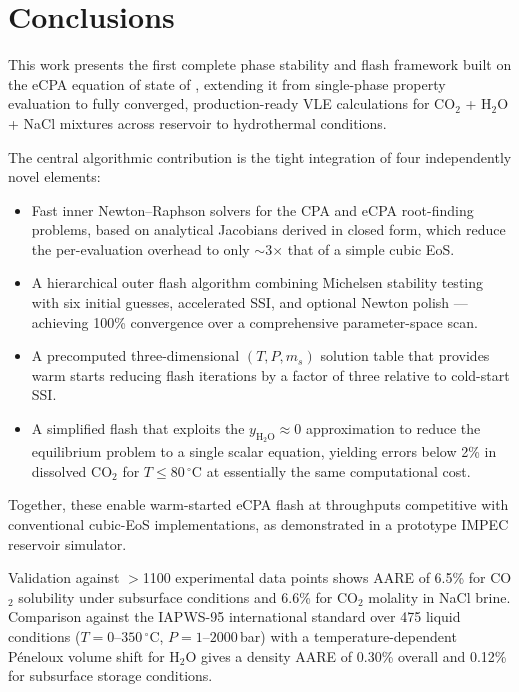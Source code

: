 \documentclass[preprint,12pt,number]{elsarticle}
\begin{document}
\section{Conclusions}
\label{sec:conclusions}

This work presents the first complete phase stability and flash framework built on the
eCPA equation of state of \citet{Coelho2025}, extending it from single-phase property
evaluation to fully converged, production-ready VLE calculations for CO$_2$ + H$_2$O +
NaCl mixtures across reservoir to hydrothermal conditions.

The central algorithmic contribution is the tight integration of four independently
novel elements:
\begin{itemize}
  \item Fast inner Newton--Raphson solvers for the CPA and eCPA root-finding problems,
        based on analytical Jacobians derived in closed form, which reduce the
        per-evaluation overhead to only $\sim$3$\times$ that of a simple cubic EoS.
  \item A hierarchical outer flash algorithm combining Michelsen stability testing with
        six initial guesses, accelerated SSI, and optional Newton polish --- achieving
        100\% convergence over a comprehensive parameter-space scan.
  \item A precomputed three-dimensional $(T, P, m_s)$ solution table that provides warm
        starts reducing flash iterations by a factor of three relative to cold-start SSI.
  \item A simplified flash that exploits the $y_{\text{H}_2\text{O}} \approx 0$
        approximation to reduce the equilibrium problem to a single scalar equation,
        yielding errors below 2\% in dissolved CO$_2$ for $T \leq 80\,^\circ$C at
        essentially the same computational cost.
\end{itemize}
Together, these enable warm-started eCPA flash at throughputs competitive with
conventional cubic-EoS implementations, as demonstrated in a prototype IMPEC reservoir
simulator.

Validation against $>$1100 experimental data points shows AARE of 6.5\% for CO$_2$
solubility under subsurface conditions and 6.6\% for CO$_2$ molality in NaCl brine.
Comparison against the IAPWS-95 international standard over 475 liquid conditions
($T = 0$--$350\,^\circ$C, $P = 1$--$2000$\,bar) with a temperature-dependent Péneloux
volume shift for H$_2$O gives a density AARE of 0.30\% overall and 0.12\% for
subsurface storage conditions.
\end{document}

